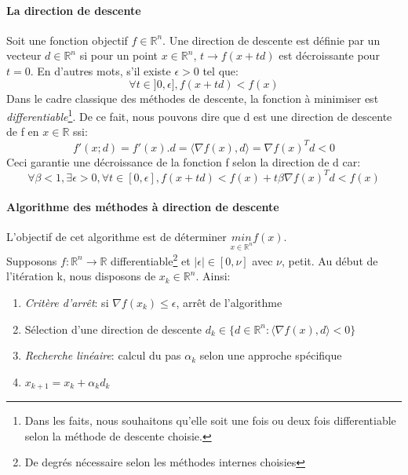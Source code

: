 \paragraph{La direction de descente}
Soit une fonction objectif $f \in \mathbb{R}^n$. Une direction de descente est définie par un vecteur $d \in \mathbb{R}^n$ si pour un point $x \in \mathbb{R}^n$, $t \rightarrow f(x+td)$ est décroissante pour $t=0$. En d'autres mots, s'il existe $\epsilon > 0$ tel que:
\begin{equation}
\forall t \in ]0,\epsilon], f(x+td)<f(x)
\label{eq_direc_des}
\end{equation}
\noindent Dans le cadre classique des méthodes de descente, la fonction à minimiser est \textit{differentiable}\footnote{Dans les faits, nous souhaitons qu'elle soit une fois ou deux fois differentiable selon la méthode de descente choisie.}. De ce fait, nous pouvons dire que d est une direction de descente de f en $x \in \mathbb{R}$ ssi:
$$f'(x;d) = f'(x).d = \langle \nabla f(x),d \rangle = \nabla f(x)^Td < 0$$
\noindent Ceci garantie une décroissance de la fonction f selon la direction de d car:
$$ \forall \beta < 1, \exists \epsilon > 0, \forall t \in [0,\epsilon], f(x+td)<f(x)+t\beta \nabla f(x)^Td<f(x)$$

\paragraph{Algorithme des méthodes à direction de descente}
L'objectif de cet algorithme est de déterminer $\underset{x \in \mathbb{R}^n}{min}f(x)$.\\

\noindent Supposons $f:\mathbb{R}^n \rightarrow \mathbb{R}$ differentiable\footnote{De degrés nécessaire selon les méthodes internes choisies} et $|\epsilon| \in [0,\nu]$ avec $\nu$, petit. Au début de l'itération k, nous disposons de $x_k \in \mathbb{R}^n$. Ainsi:

\begin{enumerate}
    \item \textit{Critère d'arrêt}: si $\nabla f(x_k) \leq \epsilon$, arrêt de l'algorithme
    \item Sélection d'une direction de descente $d_k \in \{ d \in \mathbb{R}^n : \langle \nabla f(x),d \rangle < 0\}$
    \item \textit{Recherche linéaire}: calcul du pas $\alpha_k$ selon une approche spécifique
    \item $x_{k+1}=x_k+\alpha_kd_k$
\end{enumerate}

